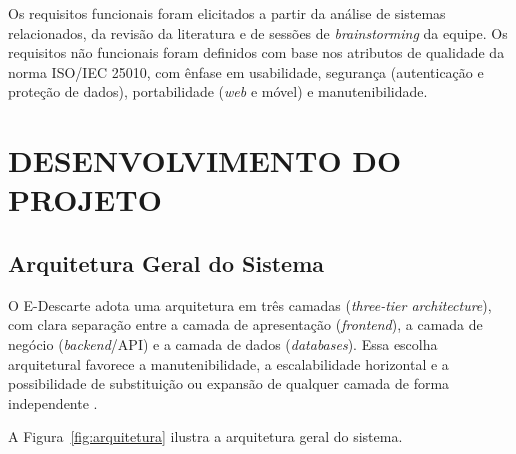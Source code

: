 \documentclass[12pt, a4paper]{article}
\numberwithin{equation}{section}
\numberwithin{figure}{section}
\numberwithin{table}{section}
\begin{document}
Os requisitos funcionais foram elicitados a partir da análise de sistemas
relacionados, da revisão da literatura e de sessões de \textit{brainstorming}
da equipe. Os requisitos não funcionais foram definidos com base nos atributos
de qualidade da norma ISO/IEC 25010, com ênfase em usabilidade, segurança
(autenticação e proteção de dados), portabilidade (\textit{web} e móvel) e
manutenibilidade.

\section{DESENVOLVIMENTO DO PROJETO}

\subsection{Arquitetura Geral do Sistema}

O E-Descarte adota uma arquitetura em três camadas (\textit{three-tier
architecture}), com clara separação entre a camada de apresentação
(\textit{frontend}), a camada de negócio (\textit{backend}/API) e a camada
de dados (\textit{databases}). Essa escolha arquitetural favorece a
manutenibilidade, a escalabilidade horizontal e a possibilidade de substituição
ou expansão de qualquer camada de forma independente \cite{sommerville2019}.

A Figura~\ref{fig:arquitetura} ilustra a arquitetura geral do sistema.
\end{document}
